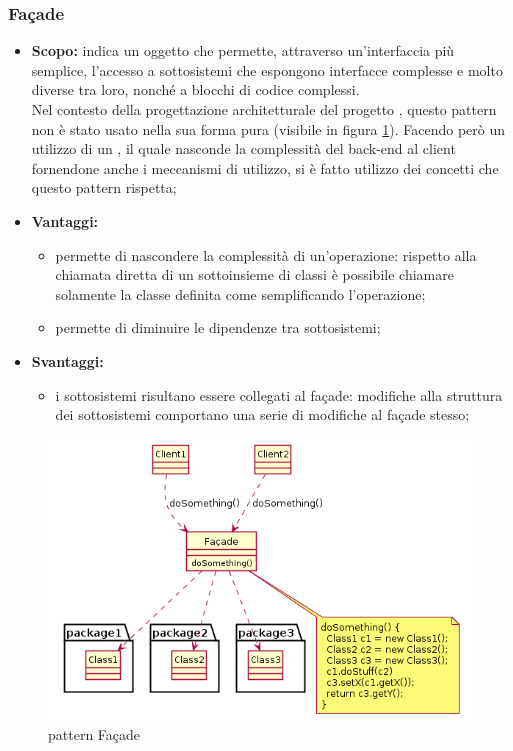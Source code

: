     \subsubsection{Façade}
      \begin{itemize}
       \item \textbf{Scopo:}  indica un oggetto che permette, attraverso un'interfaccia più semplice, l'accesso a sottosistemi che espongono interfacce complesse e molto diverse tra loro, nonché a blocchi di codice complessi. \\
       Nel contesto della progettazione architetturale del progetto \PROGETTO, questo pattern non è stato usato nella sua forma pura (visibile in figura \ref{fig:facade}). Facendo però un utilizzo di un , il quale nasconde la complessità del back-end al client fornendone anche i meccanismi di utilizzo, si è fatto utilizzo dei concetti che questo pattern rispetta;
	\item \textbf{Vantaggi:}
	  \begin{itemize}
	   \item permette di nascondere la complessità di un'operazione: rispetto alla chiamata diretta di un sottoinsieme di classi è possibile chiamare solamente la classe definita come  semplificando l'operazione;
	   \item permette di diminuire le dipendenze tra sottosistemi;
	  \end{itemize}\newpage
	\item \textbf{Svantaggi:}
	  \begin{itemize}
	   \item i sottosistemi risultano essere collegati al façade: modifiche alla struttura dei sottosistemi comportano una serie di modifiche al façade stesso;
	  \end{itemize}
	\end{itemize}
	\begin{figure}[h]
		\centering
		\includegraphics[width=\textwidth,height=\textheight,keepaspectratio,scale=0.1]{images/patternfacade.png}
		\caption{pattern Façade}\label{fig:facade}
	\end{figure}
